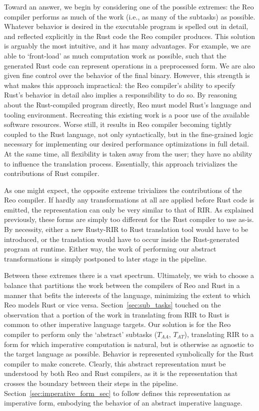 Toward an answer, we begin by considering one of the possible extremes: the Reo compiler performs as much of the work (i.e., as many of the subtasks) as possible. Whatever behavior is desired in the executable program is spelled out in detail, and reflected explicitly in the Rust code the Reo compiler produces. This solution is arguably the most intuitive, and it has many advantages. For example, we are able to `front-load' as much computation work as possible, such that the generated Rust code can represent operations in a preprocessed form. We are also given fine control over the behavior of the final binary. However, this strength is what makes this approach impractical: the Reo compiler's ability to specify Rust's behavior in detail also implies a responsibility to do so. By reasoning about the Rust-compiled program directly, Reo must model Rust's language and tooling environment. Recreating this existing work is a poor use of the available software resources. Worse still, it results in Reo compiler becoming tightly coupled to the Rust language, not only syntactically, but in the fine-grained logic necessary for implementing our desired performance optimizations in full detail. At the same time, all flexibility is taken away from the user; they have no ability to influence the translation process. Essentially, this approach trivializes the contributions of Rust compiler.

As one might expect, the opposite extreme trivializes the contributions of the Reo compiler. If hardly any transformations at all are applied before Rust code is emitted, the representation can only be very similar to that of RIR. As explained previously, these forms are simply too different for the Rust compiler to use as-is. By necessity, either a new Rusty-RIR to Rust translation tool would have to be introduced, or the translation would have to occur inside the Rust-generated program at runtime. Either way, the work of performing our abstract transformations is simply postponed to later stage in the pipeline.

Between these extremes there is a vast spectrum. Ultimately, we wish to choose a balance that partitions the work between the compilers of Reo and Rust in a manner that befits the interests of the language, minimizing the extent to which Reo models Rust or vice versa. Section~\ref{sec:sub_tasks} touched on the observation that a portion of the work in translating from RIR to Rust is common to other imperative language targets. Our solution is for the Reo compiler to perform only the `abstract' subtasks ($T_{AA}$, $T_{AT}$), translating RIR to a form for which imperative computation is natural, but is otherwise as agnostic to the target language as possible. Behavior is represented symbolically for the Rust compiler to make concrete. Clearly, this abstract representation must be understood by both Reo and Rust compilers, as it is the representation that crosses the boundary between their steps in the pipeline. Section~\ref{sec:imperative_form_sec} to follow defines this representation as imperative form, embodying the behavior of an abstract imperative language.

